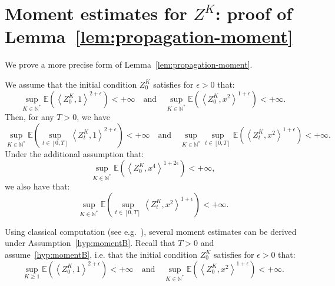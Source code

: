 \documentclass[AHL,Unicode,longabstracts,published]{cedram}
\newcommand*\N{\mathbb{N}}
\newcommand*\E{\mathbb{E}}
\begin{document}
\section{Moment estimates for \texorpdfstring{$Z^{K}$}{ZK}: proof of Lemma~\ref{lem:propagation-moment}}\label{app:moment}

We prove a more precise form of Lemma~\ref{lem:propagation-moment}.

\begin{lemm}\label{lem:propagation-moment1}
We assume that the initial condition $Z^{K}_{0}$ satisfies for $\epsilon>0$ that:
\begin{equation}\label{hyp:momentB}
\sup_{K \in \N^*}\E\left(\left\langle Z^K_0,1\right\rangle^{2+\epsilon} \right)<+\infty\quad \text{and}\quad \sup_{K\in \N^*} \E\left(\left\langle Z^K_0,x^2\right\rangle^{1+\epsilon}\right)<+\infty.
\end{equation}
Then, for any $T>0$, we have
\begin{equation}
\sup_{K \in \N^*} \E\left(\sup_{t \in [0,T]}\left\langle Z^K_t,1\right\rangle^{2+\epsilon}\right)<+\infty\quad \text{and}\quad \sup_{K \in \N^*} \sup_{t \in [0, T]} \E\left(\left\langle Z^K_t,x^2\right\rangle^{1+\epsilon}\right)<+\infty.\label{eq:propagationB}
\end{equation}
Under the additional assumption that:
\begin{equation}\label{hyp:moment2B}
\sup_{K \in \N^*}\E\left(\left\langle Z^K_0,x^4\right\rangle^{1+2\epsilon}\right)<+\infty,
\end{equation}
we also have that:
\begin{equation}
\sup_{K \in \N^*} \E\left(\sup_{t \in [0, T]} \left\langle Z^K_t,x^2\right\rangle^{1+\epsilon}\right)<+\infty.\label{eq:propagation2B}
\end{equation}

\end{lemm}



Using classical computation (see e.g.~\cite{fourniermeleard}), several moment estimates can be derived under Assumption~\eqref{hyp:momentB}. Recall that $T>0$ and assume~\eqref{hyp:momentB}, i.e. that the initial condition $Z^{K}_{0}$ satisfies for $\epsilon>0$ that:
\begin{equation*}
\sup_{K \geq 1}\E\left(\left\langle Z^K_0,1\right\rangle^{2+\epsilon} \right)<+\infty\quad \text{and}\quad \sup_{K \in \N^*} \E\left(\left\langle Z^K_0,x^2\right\rangle^{1+\epsilon}\right)<+\infty.
\end{equation*}
\end{document}
